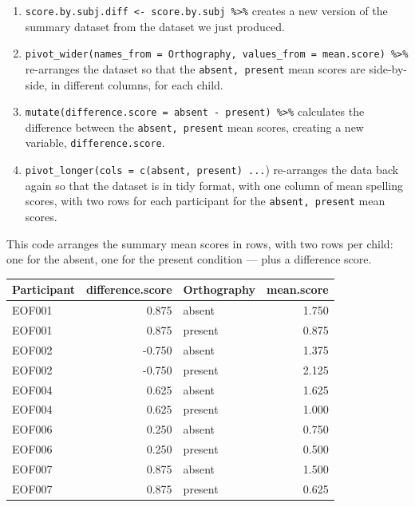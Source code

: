 \documentclass[
  letterpaper,
  DIV=11,
  numbers=noendperiod]{scrreprt}
\providecommand{\tightlist}{%
  \setlength{\itemsep}{0pt}\setlength{\parskip}{0pt}}\usepackage{longtable,booktabs,array}
\begin{document}
\begin{enumerate}
\def\labelenumi{\arabic{enumi}.}
\tightlist
\item
  \texttt{score.by.subj.diff\ \textless{}-\ score.by.subj\ \%\textgreater{}\%}
  creates a new version of the summary dataset from the dataset we just
  produced.
\item
  \texttt{pivot\_wider(names\_from\ =\ Orthography,\ values\_from\ =\ mean.score)\ \%\textgreater{}\%}
  re-arranges the dataset so that the \texttt{absent,\ present} mean
  scores are side-by-side, in different columns, for each child.
\item
  \texttt{mutate(difference.score\ =\ absent\ -\ present)\ \%\textgreater{}\%}
  calculates the difference between the \texttt{absent,\ present} mean
  scores, creating a new variable, \texttt{difference.score}.
\item
  \texttt{pivot\_longer(cols\ =\ c(absent,\ present)\ ...}) re-arranges
  the data back again so that the dataset is in tidy format, with one
  column of mean spelling scores, with two rows for each participant for
  the \texttt{absent,\ present} mean scores.
\end{enumerate}

This code arranges the summary mean scores in rows, with two rows per
child: one for the absent, one for the present condition --- plus a
difference score.

\begin{table}
\centering
\begin{tabular}{l|r|l|r}
\hline
Participant & difference.score & Orthography & mean.score\\
\hline
EOF001 & 0.875 & absent & 1.750\\
\hline
EOF001 & 0.875 & present & 0.875\\
\hline
EOF002 & -0.750 & absent & 1.375\\
\hline
EOF002 & -0.750 & present & 2.125\\
\hline
EOF004 & 0.625 & absent & 1.625\\
\hline
EOF004 & 0.625 & present & 1.000\\
\hline
EOF006 & 0.250 & absent & 0.750\\
\hline
EOF006 & 0.250 & present & 0.500\\
\hline
EOF007 & 0.875 & absent & 1.500\\
\hline
EOF007 & 0.875 & present & 0.625\\
\hline
\end{tabular}
\end{table}
\end{document}
